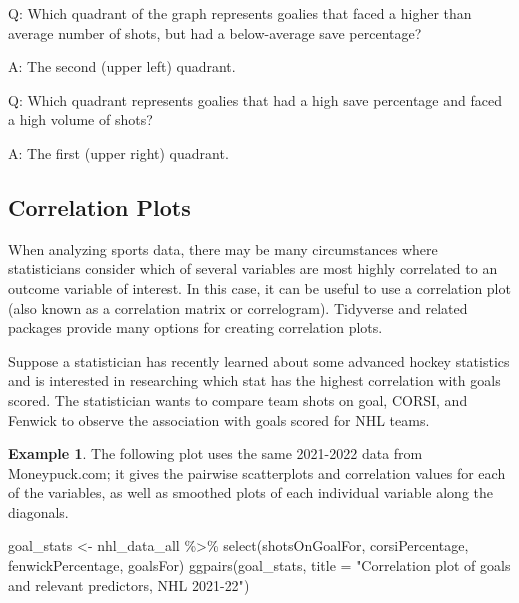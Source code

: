 \documentclass[
  11pt,
]{book}
\newenvironment{Shaded}{\begin{snugshade}}{\end{snugshade}}
\newcommand{\AttributeTok}[1]{\textcolor[rgb]{0.77,0.63,0.00}{#1}}
\newcommand{\FunctionTok}[1]{\textcolor[rgb]{0.00,0.00,0.00}{#1}}
\newcommand{\NormalTok}[1]{#1}
\newcommand{\OtherTok}[1]{\textcolor[rgb]{0.56,0.35,0.01}{#1}}
\newcommand{\SpecialCharTok}[1]{\textcolor[rgb]{0.00,0.00,0.00}{#1}}
\newcommand{\StringTok}[1]{\textcolor[rgb]{0.31,0.60,0.02}{#1}}
\theoremstyle{definition}
\theoremstyle{definition}
\newtheorem{example}{Example}[chapter]
\theoremstyle{definition}
\theoremstyle{definition}
\theoremstyle{remark}
\begin{document}
Q: Which quadrant of the graph represents goalies that faced a higher than average number of shots, but had a below-average save percentage?

A: The second (upper left) quadrant.

Q: Which quadrant represents goalies that had a high save percentage and faced a high volume of shots?

A: The first (upper right) quadrant.

\hypertarget{correlation-plots}{%
\subsection{Correlation Plots}\label{correlation-plots}}

When analyzing sports data, there may be many circumstances where statisticians consider which of several variables are most highly correlated to an outcome variable of interest. In this case, it can be useful to use a correlation plot (also known as a correlation matrix or correlogram). Tidyverse and related packages provide many options for creating correlation plots.

Suppose a statistician has recently learned about some advanced hockey statistics and is interested in researching which stat has the highest correlation with goals scored. The statistician wants to compare team shots on goal, CORSI, and Fenwick to observe the association with goals scored for NHL teams.

\begin{example}
The following plot uses the same 2021-2022 data from Moneypuck.com; it gives the pairwise scatterplots and correlation values for each of the variables, as well as smoothed plots of each individual variable along the diagonals.
\end{example}

\begin{Shaded}
\begin{Highlighting}[]
\NormalTok{goal\_stats }\OtherTok{\textless{}{-}}\NormalTok{ nhl\_data\_all }\SpecialCharTok{\%\textgreater{}\%}
    \FunctionTok{select}\NormalTok{(shotsOnGoalFor, corsiPercentage, fenwickPercentage, goalsFor)}
\FunctionTok{ggpairs}\NormalTok{(goal\_stats, }\AttributeTok{title =} \StringTok{"Correlation plot of goals and relevant predictors, NHL 2021{-}22"}\NormalTok{)}
\end{Highlighting}
\end{Shaded}
\end{document}
